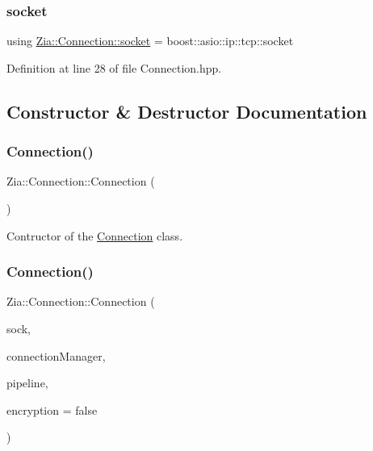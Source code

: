 \subsubsection{\texorpdfstring{socket}{socket}}
{\footnotesize\ttfamily using \hyperlink{class_zia_1_1_connection_a1b74e276e0f3aa8dbabdaed80a0936e6}{Zia\+::\+Connection\+::socket} =  boost\+::asio\+::ip\+::tcp\+::socket}



Definition at line 28 of file Connection.\+hpp.



\subsection{Constructor \& Destructor Documentation}
\mbox{\label{class_zia_1_1_connection_a06a6c69bf205afa9868169a1435129c1}} 
\subsubsection{\texorpdfstring{Connection()}{Connection()}\hspace{0.1cm}{\footnotesize\ttfamily [1/2]}}
{\footnotesize\ttfamily Zia\+::\+Connection\+::\+Connection (\begin{DoxyParamCaption}\item[{void}]{ }\end{DoxyParamCaption})\hspace{0.3cm}{\ttfamily [delete]}}



Contructor of the \hyperlink{class_zia_1_1_connection}{Connection} class. 

\mbox{\label{class_zia_1_1_connection_a61438cdd01805cd466d1382eafcb1576}} 
\subsubsection{\texorpdfstring{Connection()}{Connection()}\hspace{0.1cm}{\footnotesize\ttfamily [2/2]}}
{\footnotesize\ttfamily Zia\+::\+Connection\+::\+Connection (\begin{DoxyParamCaption}\item[{\hyperlink{class_zia_1_1_connection_a1b74e276e0f3aa8dbabdaed80a0936e6}{socket}}]{sock,  }\item[{\hyperlink{class_zia_1_1_connection_manager}{Connection\+Manager} \&}]{connection\+Manager,  }\item[{o\+Z\+::\+Pipeline \&}]{pipeline,  }\item[{bool}]{encryption = {\ttfamily false} }\end{DoxyParamCaption})}



